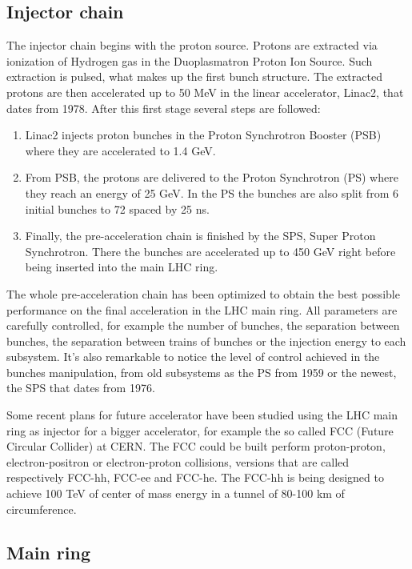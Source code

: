 \subsection{Injector chain}
\label{sec:injector}

The injector chain begins with the proton source. Protons are extracted via ionization of Hydrogen gas in the Duoplasmatron Proton Ion Source. Such extraction is pulsed, what makes up the first bunch structure. The extracted protons are then accelerated up to 50 MeV in the linear accelerator, Linac2, that dates from 1978. After this first stage several steps are followed:
\begin{enumerate}
\item Linac2 injects proton bunches in the Proton Synchrotron Booster (PSB) where they are accelerated to 1.4 GeV. 
\item From PSB, the protons are delivered to the Proton Synchrotron (PS) where they reach an energy of 25 GeV. In the PS the bunches are also split from 6 initial bunches to 72 spaced by 25 ns.
\item Finally, the pre-acceleration chain is finished by the SPS, Super Proton Synchrotron. There the bunches are accelerated up to 450 GeV right before being inserted into the main LHC ring. 
\end{enumerate}

The whole pre-acceleration chain has been optimized to obtain the best possible performance on the final acceleration in the LHC main ring. All parameters are carefully controlled, for example the number of bunches, the separation between bunches, the separation between trains of bunches or the injection energy to each subsystem. It's also remarkable to notice the level of control achieved in the bunches manipulation, from old subsystems as the PS from 1959 or the newest, the SPS that dates from 1976. 

Some recent plans for future accelerator have been studied using the LHC main ring as injector for a bigger accelerator, for example the so called FCC (Future Circular Collider) at CERN. The FCC could be built perform proton-proton, electron-positron or electron-proton collisions, versions that are called respectively FCC-hh, FCC-ee and FCC-he. The FCC-hh is being designed to achieve 100 TeV of center of mass energy in a tunnel of 80-100 km of circumference. 

\subsection{Main ring}
\label{sec:ring}

